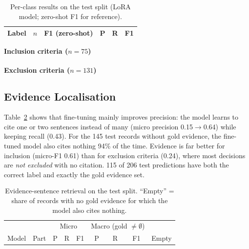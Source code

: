 \documentclass[conference]{IEEEtran}
\begin{document}
\begin{table}[t]
\centering
\caption{Per-class results on the test split (LoRA model; zero-shot F1 for reference).}
\label{tab:perclass}
\footnotesize
\begin{tabular}{lrcccc}
\toprule
Label & $n$ & F1 (zero-shot) & P & R & F1 \\
\midrule

\bottomrule
\end{tabular}
\end{table}

\begin{table}[t]
\centering
\caption{Zero-shot test confusion matrix, all 206 criteria (rows: expert label).}
\label{tab:cmbase}
\footnotesize
\resizebox{\columnwidth}{!}{}
\end{table}

\begin{table}[t]
\centering
\caption{Test confusion matrices of the LoRA model (rows: expert label).}
\label{tab:cm}
\footnotesize
\textbf{Inclusion criteria ($n{=}75$)}\\[1mm]
\\[2mm]
\textbf{Exclusion criteria ($n{=}131$)}\\[1mm]

\end{table}

\subsection{Evidence Localisation}
Table~\ref{tab:evidence} shows that fine-tuning mainly improves precision: the model learns to cite one or two sentences instead of many (micro precision 0.15$\rightarrow$0.64) while keeping recall (0.43). For the 145 test records without gold evidence, the fine-tuned model also cites nothing 94\% of the time. Evidence is far better for inclusion (micro-F1 0.61) than for exclusion criteria (0.24), where most decisions are \emph{not excluded} with no citation. 115 of 206 test predictions have both the correct label and exactly the gold evidence set.

\begin{table}[t]
\centering
\caption{Evidence-sentence retrieval on the test split. ``Empty'' = share of records with no gold evidence for which the model also cites nothing.}
\label{tab:evidence}
\setlength{\tabcolsep}{2.5pt}
\footnotesize
\begin{tabular}{llccccccc}
\toprule
& & \multicolumn{3}{c}{Micro} & \multicolumn{3}{c}{Macro (gold $\neq\emptyset$)} & \\
Model & Part & P & R & F1 & P & R & F1 & Empty \\
\midrule

\bottomrule
\end{tabular}
\end{table}
\end{document}
